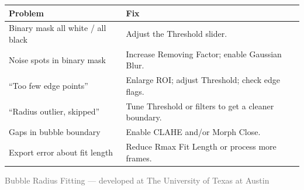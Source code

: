 \documentclass[11pt, letterpaper]{article}
\begin{document}
\begin{center}
\renewcommand{\arraystretch}{1.4}
\begin{tabular}{p{5cm}p{7.5cm}}
    \toprule
    \textbf{Problem} & \textbf{Fix} \\
    \midrule
    Binary mask all white / all black &
        Adjust the Threshold slider. \\
    Noise spots in binary mask &
        Increase Removing Factor; enable Gaussian Blur. \\
    ``Too few edge points'' &
        Enlarge ROI; adjust Threshold; check edge flags. \\
    ``Radius outlier, skipped'' &
        Tune Threshold or filters to get a cleaner boundary. \\
    Gaps in bubble boundary &
        Enable CLAHE and/or Morph Close. \\
    Export error about fit length &
        Reduce Rmax Fit Length or process more frames. \\
    \bottomrule
\end{tabular}
\end{center}

\vfill
\begin{center}
    \small\textcolor{dimgrey}{%
        Bubble Radius Fitting --- developed at The University of Texas at Austin
    }
\end{center}
\end{document}
